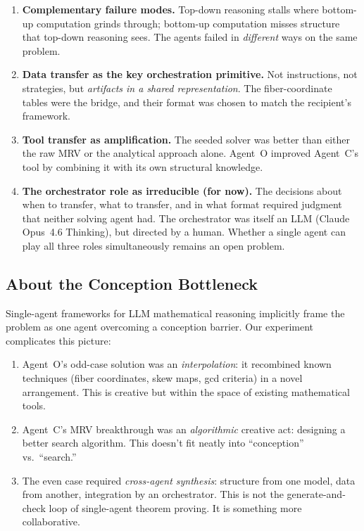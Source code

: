 \documentclass[11pt]{article}
\theoremstyle{definition}
\theoremstyle{remark}
\begin{document}
\begin{enumerate}[label=(\alph*)]
    \item \textbf{Complementary failure modes.} Top-down reasoning stalls where bottom-up computation grinds through; bottom-up computation misses structure that top-down reasoning sees. The agents failed in \emph{different} ways on the same problem.
    \item \textbf{Data transfer as the key orchestration primitive.} Not instructions, not strategies, but \emph{artifacts in a shared representation}. The fiber-coordinate tables were the bridge, and their format was chosen to match the recipient's framework.
    \item \textbf{Tool transfer as amplification.} The seeded solver was better than either the raw MRV or the analytical approach alone. Agent~O improved Agent~C's tool by combining it with its own structural knowledge.
    \item \textbf{The orchestrator role as irreducible (for now).} The decisions about when to transfer, what to transfer, and in what format required judgment that neither solving agent had. The orchestrator was itself an LLM (Claude Opus~4.6 Thinking), but directed by a human. Whether a single agent can play all three roles simultaneously remains an open problem.
\end{enumerate}

\subsection{About the Conception Bottleneck}

Single-agent frameworks for LLM mathematical reasoning implicitly frame the problem as one agent overcoming a conception barrier. Our experiment complicates this picture:

\begin{enumerate}[label=(\alph*)]
    \item Agent~O's odd-case solution was an \emph{interpolation}: it recombined known techniques (fiber coordinates, skew maps, gcd criteria) in a novel arrangement. This is creative but within the space of existing mathematical tools.
    \item Agent~C's MRV breakthrough was an \emph{algorithmic} creative act: designing a better search algorithm. This doesn't fit neatly into ``conception'' vs.\ ``search.''
    \item The even case required \emph{cross-agent synthesis}: structure from one model, data from another, integration by an orchestrator. This is not the generate-and-check loop of single-agent theorem proving. It is something more collaborative.
\end{enumerate}
\end{document}
